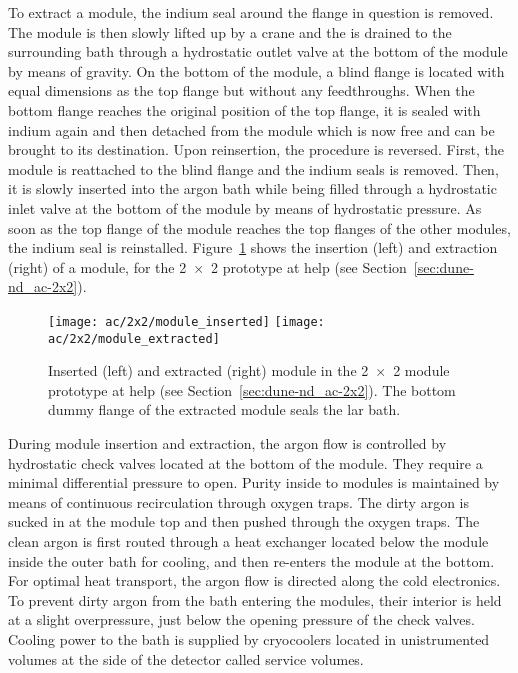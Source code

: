 To extract a module, the indium seal around the flange in question is removed.
The module is then slowly lifted up by a crane and the \lar{} is drained to the surrounding bath through a hydrostatic outlet valve at the bottom of the module by means of gravity.
On the bottom of the module, a blind flange is located with equal dimensions as the top flange but without any feedthroughs.
When the bottom flange reaches the original position of the top flange, it is sealed with indium again and then detached from the module which is now free and can be brought to its destination.
Upon reinsertion, the procedure is reversed.
First, the module is reattached to the blind flange and the indium seals is removed.
Then, it is slowly inserted into the argon bath while being filled through a hydrostatic inlet valve at the bottom of the module by means of hydrostatic pressure.
As soon as the top flange of the module reaches the top flanges of the other modules, the indium seal is reinstalled.
Figure~\ref{fig:ac_module-ins-ext} shows the insertion (left) and extraction (right) of a module, for the \num{2 x 2} prototype at \gls{help} (see Section~\ref{sec:dune-nd_ac-2x2}).

\begin{figure}[htb]
	\centering
	\texttt{[image: ac/2x2/module\_inserted]}
	\texttt{[image: ac/2x2/module\_extracted]}
	\caption[\AC{} module insertion and extraction]{%
		Inserted (left) and extracted (right) \AC{} module in the \num{2 x 2} module prototype at \acrshort{help} (see Section~\ref{sec:dune-nd_ac-2x2}).
		The bottom dummy flange of the extracted module seals the \acrshort{lar} bath.
	}
	\label{fig:ac_module-ins-ext}
\end{figure}

During module insertion and extraction, the argon flow is controlled by hydrostatic check valves located at the bottom of the module.
They require a minimal differential pressure to open.
Purity inside to modules is maintained by means of continuous \lar{} recirculation through oxygen traps.
The dirty argon is sucked in at the module top and then pushed through the oxygen traps.
The clean argon is first routed through a heat exchanger located below the module inside the outer bath for cooling, and then re-enters the module at the bottom.
For optimal heat transport, the argon flow is directed along the cold electronics.
To prevent dirty argon from the bath entering the modules, their interior is held at a slight overpressure, just below the opening pressure of the check valves.
Cooling power to the bath is supplied by cryocoolers located in unistrumented volumes at the side of the detector called service volumes.

